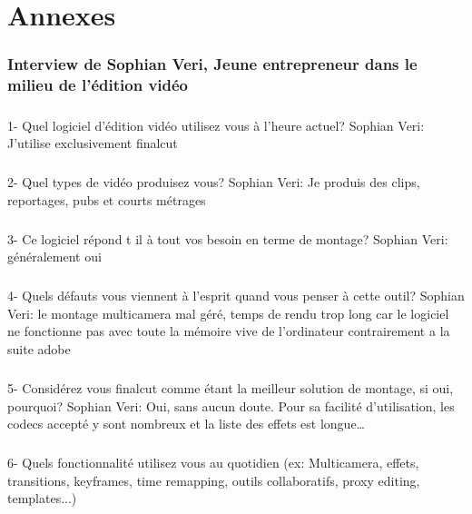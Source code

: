 \newpage
\chapter*{Annexes}
\subsection {Interview de Sophian Veri,
Jeune entrepreneur dans le milieu de l'édition vidéo}

\paragraph{}
1-  Quel logiciel d'édition vidéo utilisez vous à l'heure actuel?
Sophian Veri: J'utilise exclusivement finalcut

\paragraph{}
2- Quel types de vidéo produisez vous?
Sophian Veri: Je produis des clips, reportages, pubs et courts métrages

\paragraph{}
3- Ce logiciel répond t il à tout vos besoin en terme de montage?
Sophian Veri: généralement oui

\paragraph{}
4- Quels défauts vous viennent à l'esprit quand vous penser à cette outil?
Sophian Veri: le montage multicamera mal géré, temps de rendu trop long car le
logiciel ne fonctionne pas avec toute la mémoire vive de l'ordinateur
contrairement a la suite adobe

\paragraph{}
5- Considérez vous finalcut comme étant la meilleur solution de montage,
si oui, pourquoi?
Sophian Veri: Oui, sans aucun doute. Pour sa facilité d'utilisation,
les codecs accepté y sont nombreux et la liste des effets est
longue\ldots

\paragraph{}
6-  Quels fonctionnalité utilisez vous au quotidien (ex: Multicamera, effets,
transitions, keyframes, time remapping, outils collaboratifs, proxy
editing, templates...)

